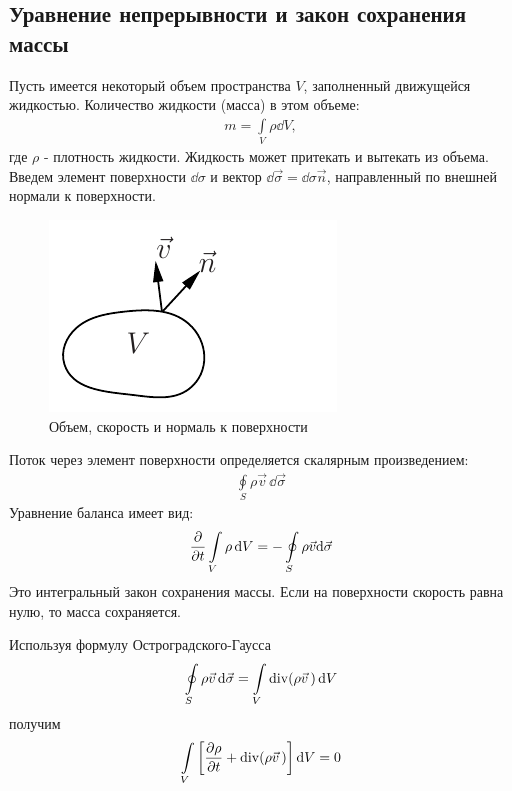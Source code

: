 \subsection{Уравнение непрерывности и закон сохранения массы}
Пусть имеется некоторый объем пространства $V$, заполненный движущейся  жидкостью. Количество жидкости (масса) в этом объеме:
\begin{align*} 
m=\int\limits_{V} \rho\dd{V},
\end{align*}
где $\rho$ - плотность жидкости. Жидкость может притекать и вытекать из объема. Введем элемент поверхности $ \dd\sigma $ и вектор $ \dd \vec{\sigma}=\dd\sigma \vec{n} $, направленный по внешней нормали к поверхности. 
\begin{figure}[H]
	\vspace{-10pt}
	\centering
	\includegraphics[scale=1]{photo/4.pdf}
	\caption{Объем, скорость и нормаль к поверхности}
	\label{fig:figure4}
\end{figure}
Поток через элемент поверхности определяется скалярным произведением:
\begin{align*}
\oint\limits_{S} \rho \vec{v}\, \dd\vec{\sigma}%
\end{align*}
Уравнение баланса имеет вид: 
\begin{align*} 
\pdv{t} \int\limits_{V} \rho\dd{V}=-\oint\limits_{S} \rho \vec{v} \dd\vec{\sigma}
\end{align*}
Это интегральный закон сохранения массы. Если на поверхности скорость равна нулю, то масса сохраняется.

Используя формулу Остроградского-Гаусса
\begin{align*} 
\oint\limits_{S} \rho \vec{v}\, \dd \vec{\sigma}=\int\limits_{V} \operatorname{div} (\rho \vec{v}\,)\dd{V}
\end{align*}
получим 
\begin{align*} 
\int\limits_{V}\left[\frac{\partial \rho}{\partial t}+\operatorname{div}(\rho \vec{v}\,)\right]\dd{V}=0
\end{align*}

